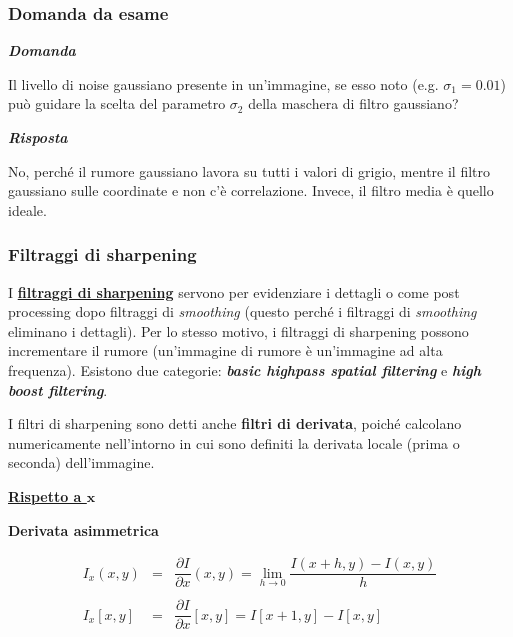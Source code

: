 \documentclass[a4paper]{article}
\begin{document}
	\subsubsection{Domanda da \textcolor{Red3}{esame}}
	
	\textcolor{Red3}{\textbf{\emph{Domanda}}}\newline
	
	\noindent
	Il livello di noise gaussiano presente in un'immagine, se esso noto (e.g. $\sigma_{1} = 0.01$) può guidare la scelta del parametro $\sigma_{2}$ della maschera di filtro gaussiano?\newline
	
	\noindent
	\textcolor{Green4}{\textbf{\emph{Risposta}}}\newline
	
	\noindent
	No, perché il rumore gaussiano lavora su tutti i valori di grigio, mentre il filtro gaussiano sulle coordinate e non c'è correlazione. Invece, il filtro media è quello ideale.
	
	\newpage
	
	\subsubsection{Filtraggi di sharpening}
	
	I \textcolor{Red3}{\textbf{\underline{filtraggi di sharpening}}} servono per evidenziare i dettagli o come post processing dopo filtraggi di \emph{smoothing} (questo perché i filtraggi di \emph{smoothing} eliminano i dettagli). Per lo stesso motivo, i filtraggi di sharpening possono incrementare il rumore (un'immagine di rumore è un'immagine ad alta frequenza). Esistono due categorie: \textbf{\emph{basic highpass spatial filtering}} e \textbf{\emph{high boost filtering}}.\newline
	
	\noindent
	I filtri di sharpening sono detti anche \textbf{filtri di derivata}, poiché calcolano numericamente nell'intorno in cui sono definiti la derivata locale (prima o seconda) dell'immagine.
	
	\begin{center}
		\textcolor{Red3}{\textbf{\underline{Rispetto a $\boldsymbol{x}$}}}
	\end{center}

	\noindent
	\textcolor{Green4}{\textbf{Derivata asimmetrica}}
	
	\begin{equation*}
		\begin{array}{lll}
			I_{x}\left(x,y\right) & = & \dfrac{\partial I}{\partial x}\left(x,y\right) = \lim_{h \rightarrow 0} \dfrac{I\left(x+h, y\right) - I\left(x,y\right)}{h} \\
			&& \\
			I_{x}\left[x,y\right] & = & \dfrac{\partial I}{\partial x}\left[x,y\right] = I\left[x+1, y\right] - I\left[x,y\right]
		\end{array}
	\end{equation*}
\end{document}
